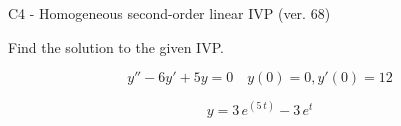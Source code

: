 \begin{exercise}
  \begin{exerciseTitle}C4 - Homogeneous second-order linear IVP (ver. 68)\end{exerciseTitle}
  \begin{exerciseStatement}
    
Find the solution to the given IVP.

    
\[y''-6y'+5y = 0 \hspace{1em} y(0) = 0 , y'(0) = 12\]

  \end{exerciseStatement}
  \begin{exerciseAnswer}
    
\[y= 3 \, e^{\left(5 \, t\right)} - 3 \, e^{t}\]

  \end{exerciseAnswer}
\end{exercise}